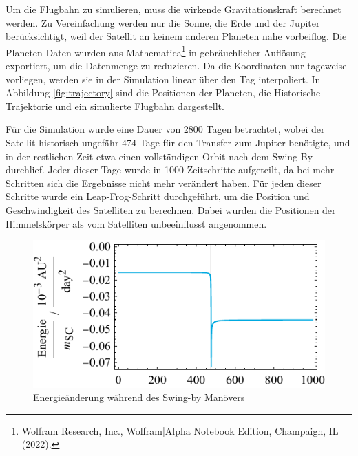 Um die Flugbahn zu simulieren, muss die wirkende Gravitationskraft berechnet werden.
Zu Vereinfachung werden nur die Sonne, die Erde und der Jupiter berücksichtigt, weil der Satellit an keinem anderen Planeten nahe vorbeiflog.
Die Planeten-Daten wurden aus Mathematica\footnote{Wolfram Research, Inc., Wolfram|Alpha Notebook Edition, Champaign, IL (2022).} in gebräuchlicher Auflösung exportiert, um die Datenmenge zu reduzieren.
Da die Koordinaten nur tageweise vorliegen, werden sie in der Simulation linear über den Tag interpoliert.
In Abbildung \ref{fig:trajectory} sind die Positionen der Planeten, die Historische Trajektorie und ein simulierte Flugbahn dargestellt.

Für die Simulation wurde eine Dauer von 2800 Tagen betrachtet, wobei der Satellit historisch ungefähr 474 Tage für den Transfer zum Jupiter benötigte, und in der restlichen Zeit etwa einen vollständigen Orbit nach dem Swing-By durchlief.
Jeder dieser Tage wurde in 1000 Zeitschritte aufgeteilt, da bei mehr Schritten sich die Ergebnisse nicht mehr verändert haben.
Für jeden dieser Schritte wurde ein Leap-Frog-Schritt durchgeführt, um die Position und Geschwindigkeit des Satelliten zu berechnen. Dabei wurden die Positionen der Himmelskörper als vom Satelliten unbeeinflusst angenommen.


\begin{figure}[h!]
	\centering
	\includegraphics{img/energy.pdf}
	\caption{Energieänderung während des Swing-by Manövers}
\end{figure}



